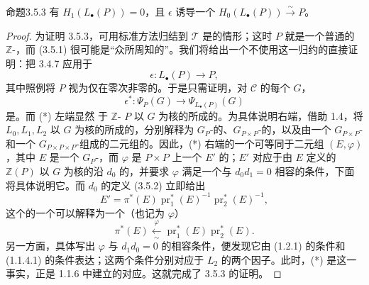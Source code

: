\begin{SGAresult}{命题}{3.5.3}
有 $H_1(L_\bullet(P))=0$，且 $\epsilon$ 诱导一个 $H_0(L_\bullet(P))\xrightarrow{\sim}P$。
\end{SGAresult}
\begin{proof}
为证明 3.5.3，可用标准方法归结到 $\mathcal T$ 是的情形；这时 $P$ 就是一个普通的 $\mathbb Z$-，而 (3.5.1) 很可能是“众所周知的”。我们将给出一个不使用这一归约的直接证明：把 3.4.7 应用于
\[
\epsilon:L_\bullet(P)\longrightarrow P,
\]
其中照例将 $P$ 视为仅在零次非零的。于是只需证明，对 $\mathcal C$ 的每个 $G$，
\[
\epsilon^*:\Psi_P(G)\longrightarrow\Psi_{L_\bullet(P)}(G)\tag{*}
\]
是。而 (*) 左端显然
于 $\mathbb Z$- $P$ 以 $G$ 为核的所成的。为具体说明右端，借助 1.4，将 $L_0,L_1,L_2$ 以 $G$ 为核的所成的，分别解释为 $G_P$-的、$G_{P\times P}$-的，以及由一个 $G_{P\times P}$-和一个 $G_{P\times P\times P}$-组成的二元组的。因此，(*) 右端的一个可等同于二元组 $(E,\varphi)$，其中 $E$ 是一个 $G_P$-，而 $\varphi$ 是 $P\times P$ 上一个 $E'$ 的；$E'$ 对应于由 $E$ 定义的 $\mathbb Z(P)$ 以 $G$ 为核的沿 $d_0$ 的，并要求 $\varphi$ 满足一个与 $d_0d_1=0$ 相容的条件，下面将具体说明它。而 $d_0$ 的定义 (3.5.2) 立即给出
\[
E'=\pi^*(E)\operatorname{pr}_1^*(E)^{-1}\operatorname{pr}_2^*(E)^{-1},
\]
这个的一个可以解释为一个（也记为 $\varphi$）
\[
\pi^*(E)\xleftarrow[\sim]{\varphi}\operatorname{pr}_1^*(E)\operatorname{pr}_2^*(E).
\]
另一方面，具体写出 $\varphi$ 与 $d_1d_0=0$ 的相容条件，便发现它由 (1.2.1) 的条件和 (1.1.4.1) 的条件表达；这两个条件分别对应于 $L_2$ 的两个因子。此时，(*) 是这一事实，正是 1.1.6 中建立的对应。这就完成了 3.5.3 的证明。
\end{proof}

